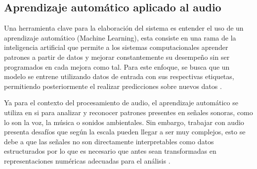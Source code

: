 \subsection{Aprendizaje automático aplicado al audio}
Una herramienta clave para la elaboración del sistema es entender el uso de un aprendizaje automático (Machine Learning), esta consiste en una rama de la inteligencia artificial que permite a los sistemas computacionales aprender patrones a partir de datos y mejorar constantemente su desempeño sin ser programados en cada mejora como tal. Para este enfoque, se busca que un modelo se entrene utilizando datos de entrada con sus respectivas etiquetas, permitiendo posteriormente el realizar predicciones sobre nuevos datos \cite{jamshidi2024machine}.


Ya para el contexto del procesamiento de audio, el aprendizaje automático se utiliza en si para analizar y reconocer patrones presentes en señales sonoras, como lo son la voz, la música o sonidos ambientales. Sin embargo, trabajar con audio presenta desafíos que según la escala pueden llegar a ser muy complejos, esto se debe a que las señales no son directamente interpretables como datos estructurados por lo que es necesario que antes sean transformadas en representaciones numéricas adecuadas para el análisis \cite{roman2020data}.